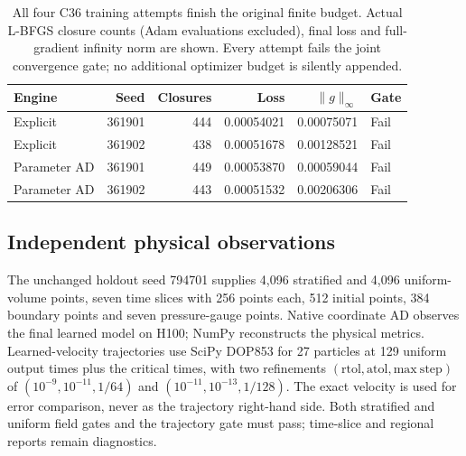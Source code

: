 \documentclass[11pt]{article}
\begin{document}
\begin{table}[htbp]\centering\small
\setlength{\tabcolsep}{4pt}
\caption{All four C36 training attempts finish the original finite budget. Actual L-BFGS closure counts (Adam evaluations excluded), final loss and full-gradient infinity norm are shown. Every attempt fails the joint convergence gate; no additional optimizer budget is silently appended.}
\label{tab:c36training}
\begin{tabular}{lrrrrl}\toprule
Engine & Seed & Closures & Loss & $\|g\|_\infty$ & Gate\\\midrule
Explicit & 361901 & 444 & 0.00054021 & 0.00075071 & Fail\\
Explicit & 361902 & 438 & 0.00051678 & 0.00128521 & Fail\\
Parameter AD & 361901 & 449 & 0.00053870 & 0.00059044 & Fail\\
Parameter AD & 361902 & 443 & 0.00051532 & 0.00206306 & Fail
\\\bottomrule\end{tabular}
\end{table}

\subsection{Independent physical observations}
The unchanged holdout seed 794701 supplies 4,096 stratified and 4,096
uniform-volume points, seven time slices with 256 points each, 512 initial
points, 384 boundary points and seven pressure-gauge points. Native
coordinate AD observes the final learned model on H100; NumPy reconstructs
the physical metrics. Learned-velocity trajectories use SciPy DOP853 for
27 particles at 129 uniform output times plus the critical times, with two
refinements $(\mathrm{rtol},\mathrm{atol},\mathrm{max\ step})$ of
$(10^{-9},10^{-11},1/64)$ and $(10^{-11},10^{-13},1/128)$. The exact
velocity is used for error comparison, never as the trajectory right-hand
side. Both stratified and uniform field gates and the trajectory gate must
pass; time-slice and regional reports remain diagnostics.
\end{document}
